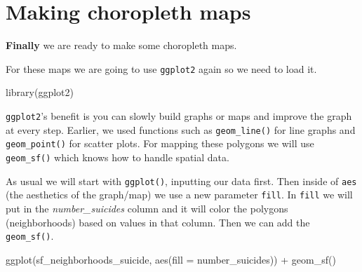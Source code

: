 \documentclass[
  12pt,
  openany]{book}
\newenvironment{Shaded}{\begin{snugshade}}{\end{snugshade}}
\newcommand{\AttributeTok}[1]{\textcolor[rgb]{0.61,0.61,0.61}{#1}}
\newcommand{\CommentTok}[1]{\textcolor[rgb]{0.37,0.37,0.37}{\textit{#1}}}
\newcommand{\FunctionTok}[1]{\textcolor[rgb]{0,0,0}{#1}}
\newcommand{\NormalTok}[1]{#1}
\newcommand{\SpecialCharTok}[1]{\textcolor[rgb]{0,0,0}{#1}}
\begin{document}
\begin{Shaded}
\end{Shaded}

\hypertarget{making-choropleth-maps}{%
\section{Making choropleth maps}\label{making-choropleth-maps}}

\textbf{Finally} we are ready to make some choropleth maps.

For these maps we are going to use \texttt{ggplot2} again so we need to load it.

\begin{Shaded}
\begin{Highlighting}[]
\FunctionTok{library}\NormalTok{(ggplot2)}
\end{Highlighting}
\end{Shaded}

\texttt{ggplot2}'s benefit is you can slowly build graphs or maps and improve the graph at every step. Earlier, we used functions such as \texttt{geom\_line()} for line graphs and \texttt{geom\_point()} for scatter plots. For mapping these polygons we will use \texttt{geom\_sf()} which knows how to handle spatial data.

As usual we will start with \texttt{ggplot()}, inputting our data first. Then inside of \texttt{aes} (the aesthetics of the graph/map) we use a new parameter \texttt{fill}. In \texttt{fill} we will put in the \emph{number\_suicides} column and it will color the polygons (neighborhoods) based on values in that column. Then we can add the \texttt{geom\_sf()}.

\begin{Shaded}
\begin{Highlighting}[]
\FunctionTok{ggplot}\NormalTok{(sf\_neighborhoods\_suicide, }\FunctionTok{aes}\NormalTok{(}\AttributeTok{fill =}\NormalTok{ number\_suicides)) }\SpecialCharTok{+}
  \FunctionTok{geom\_sf}\NormalTok{() }
\end{Highlighting}
\end{Shaded}
\end{document}
